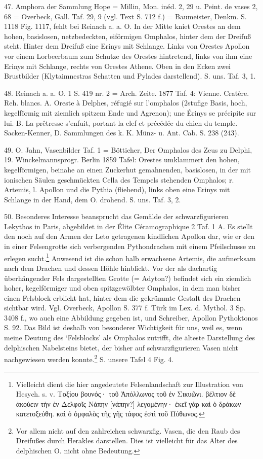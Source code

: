 \documentclass[a4paper, 11pt, oneside]{article}
\begin{document}
47. Amphora der Sammlung Hope = Millin, Mon. inéd. 2, 29 u. Peint. de vases 2, 68 = Overbeck, Gall. Taf. 29, 9 (vgl. Text S. 712 f.) = Baumeister, Denkm. S. 1118 Fig. 1117, fehlt bei Reinach a. a. O. In der Mitte kniet Orestes an dem hohen, basislosen, netzbedeckten, eiförmigen Omphalos, hinter dem der Dreifuß steht. Hinter dem Dreifuß eine Erinys mit Schlange. Links von Orestes Apollon vor einem Lorbeerbaum zum Schutze des Orestes hintretend, links von ihm eine Erinys mit Schlange, rechts von Orestes Athene. Oben in den Ecken zwei Brustbilder (Klytaimnestras Schatten und Pylades darstellend). S. uns. Taf. 3, 1.

48. Reinach a. a. O. 1 S. 419 nr. 2 = Arch. Zeite. 1877 Taf. 4: Vienne. Cratère. Reh. blancs. A. Oreste à Delphes, réfugié sur l'omphalos (2stufige Basis, hoch, kegelförmig mit ziemlich spitzem Ende und Agrenon); une Érinys se précipite sur lui. B. La prêtresse s'enfuit, portant la clef et précédée du chien du temple. Sacken-Kenner, D. Sammlungen des k. K. Münz- u. Ant. Cab. S. 238 (243).

49. O. Jahn, Vasenbilder Taf. 1 = Bötticher, Der Omphalos des Zeus zu Delphi, 19. Winckelmannsprogr. Berlin 1859 Tafel: Orestes umklammert den hohen, kegelförmigen, beinahe an einen Zuckerhut gemahnenden, basislosen, in der mit ionischen Säulen geschmückten Cella des Tempels stehenden Omphalos; r. Artemis, l. Apollon und die Pythia (fliehend), links oben eine Erinys mit Schlange in der Hand, dem O. drohend. S. uns. Taf. 3, 2.

50. Besonderes Interesse beansprucht das Gemälde der schwarzfigurieren Lekythos in Paris, abgebildet in der Élite Céramographique 2 Taf. 1 A. Es stellt den noch auf den Armen der Leto getragenen kindlichen Apollon dar, wie er den in einer Felsengrotte sich verbergenden Pythondrachen mit einem Pfeilschusse zu erlegen sucht.\footnote{Vielleicht dient die hier angedeutete Felsenlandschaft zur Illustration von Hesych. s. v. Τοξίου βουνός· τοῦ Ἀπόλλωνος τοῦ ἐν Σικυῶνι. βέλτιον δὲ ἀκούειν τὴν ἐν Δελφοῖς Νάπην [νάπην?] λεγομένην· ἐκεῖ γὰρ καὶ ὁ δράκων κατετοξεύθη. καὶ ὁ ὀμφαλὸς τῆς γῆς τάφος ἐστὶ τοῦ Πύθωνος.} Anwesend ist die schon halb erwachsene Artemis, die aufmerksam nach dem Drachen und dessen Höhle hinblickt. Vor der als dachartig überhängender Fels dargestellten Grotte (= Adyton?) befindet sich ein ziemlich hoher, kegelförmiger und oben spitzgewölbter Omphalos, in dem man bisher einen Felsblock erblickt hat, hinter dem die gekrümmte Gestalt des Drachen sichtbar wird. Vgl. Overbeck, Apollon S. 377 f. Türk im Lex. d. Mythol. 3 Sp. 3408 f., wo auch eine Abbildung gegeben ist, und Schreiber, Apollon Pythoktonos S. 92. Das Bild ist deshalb von besonderer Wichtigkeit für uns, weil es, wenn meine Deutung des `Felsblocks' als Omphalos zutrifft, die älteste Darstellung des delphischen Nabelsteins bietet, der bisher auf schwarzfigurieren Vasen nicht nachgewiesen werden konnte.\footnote{Vor allem nicht auf den zahlreichen schwarzfig. Vasen, die den Raub des Dreifußes durch Herakles darstellen. Dies ist vielleicht für das Alter des delphischen O. nicht ohne Bedeutung.} S. unsere Tafel 4 Fig. 4.
\clearpage
\end{document}

